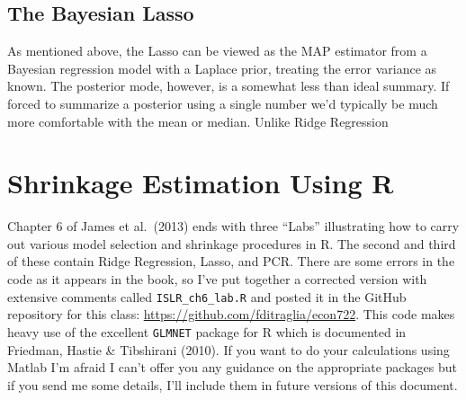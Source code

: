 \documentclass[12pt]{article}
\theoremstyle{definition}
\begin{document}
\subsection{The Bayesian Lasso}
As mentioned above, the Lasso can be viewed as the MAP estimator from a Bayesian regression model with a Laplace prior, treating the error variance as known. The posterior mode, however, is a somewhat less than ideal summary. If forced to summarize a posterior using a single number we'd typically be much more comfortable with the mean or median. Unlike Ridge Regression


\section{Shrinkage Estimation Using R}
Chapter 6 of James et al.\ (2013) ends with three ``Labs'' illustrating how to carry out various model selection and shrinkage procedures in R. The second and third of these contain Ridge Regression, Lasso, and PCR. There are some errors in the code as it appears in the book, so I've put together a corrected version with extensive comments called \texttt{ISLR\_ch6\_lab.R} and posted it in the GitHub repository for this class: \url{https://github.com/fditraglia/econ722}. This code makes heavy use of the excellent \texttt{GLMNET} package for R which is documented in Friedman, Hastie \& Tibshirani (2010). If you want to do your calculations using Matlab I'm afraid I can't offer you any guidance on the appropriate packages but if you send me some details, I'll include them in future versions of this document.
\end{document}
